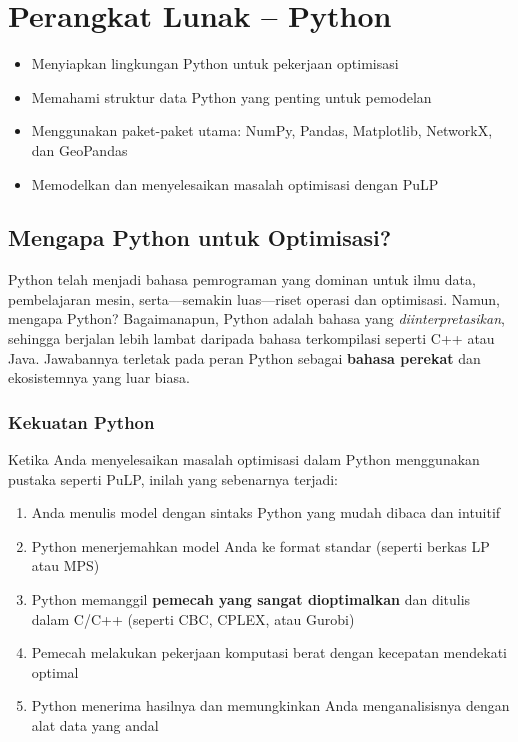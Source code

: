 \chapter{Perangkat Lunak -- Python}
\label{ch:software-python}

\begin{outcome}
\begin{itemize}
\item Menyiapkan lingkungan Python untuk pekerjaan optimisasi
\item Memahami struktur data Python yang penting untuk pemodelan
\item Menggunakan paket-paket utama: NumPy, Pandas, Matplotlib, NetworkX, dan GeoPandas
\item Memodelkan dan menyelesaikan masalah optimisasi dengan PuLP
\end{itemize}
\end{outcome}

\section{Mengapa Python untuk Optimisasi?}

Python telah menjadi bahasa pemrograman yang dominan untuk ilmu data, pembelajaran mesin, serta---semakin luas---riset operasi dan optimisasi. Namun, mengapa Python? Bagaimanapun, Python adalah bahasa yang \emph{diinterpretasikan}, sehingga berjalan lebih lambat daripada bahasa terkompilasi seperti C++ atau Java. Jawabannya terletak pada peran Python sebagai \textbf{bahasa perekat} dan ekosistemnya yang luar biasa.

\subsection{Kekuatan Python}

Ketika Anda menyelesaikan masalah optimisasi dalam Python menggunakan pustaka seperti PuLP, inilah yang sebenarnya terjadi:

\begin{enumerate}
\item Anda menulis model dengan sintaks Python yang mudah dibaca dan intuitif
\item Python menerjemahkan model Anda ke format standar (seperti berkas LP atau MPS)
\item Python memanggil \textbf{pemecah yang sangat dioptimalkan} dan ditulis dalam C/C++ (seperti CBC, CPLEX, atau Gurobi)
\item Pemecah melakukan pekerjaan komputasi berat dengan kecepatan mendekati optimal
\item Python menerima hasilnya dan memungkinkan Anda menganalisisnya dengan alat data yang andal
\end{enumerate}


